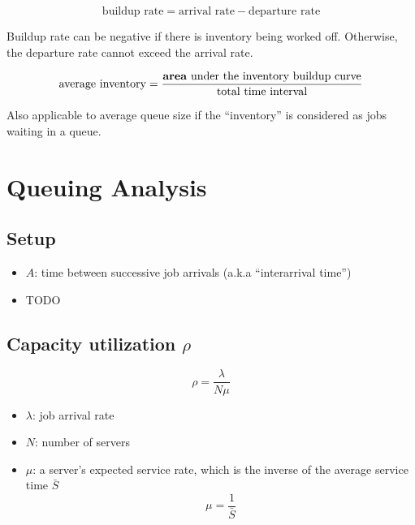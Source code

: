 \documentclass[11pt]{article}
\begin{document}
\begin{equation}
    \text{buildup rate} = \text{arrival rate} - \text{departure rate}
\end{equation}

Buildup rate can be negative if there is inventory being worked off. Otherwise, the departure rate cannot exceed the
arrival rate.

\begin{equation}
    \text{average inventory} = \frac{\text{\textbf{area} under the inventory buildup curve}}{\text{total time interval}}
\end{equation}

Also applicable to average queue size if the ``inventory'' is considered as jobs waiting in a queue.

\section{Queuing Analysis}

\subsection{Setup}

\begin{itemize}
    \item $A$: time between successive job arrivals (a.k.a ``interarrival time'')
    \item TODO
\end{itemize}

\subsection{Capacity utilization $\rho$}

\begin{equation}
    \rho = \frac{\lambda}{N \mu}
\end{equation}

\begin{itemize}
    \item $\lambda$: job arrival rate
    \item $N$: number of servers
    \item $\mu$: a server's expected service rate, which is the inverse of the average service time $\bar{S}$ \begin{equation}
        \mu = \frac{1}{\bar{S}}
    \end{equation}
\end{itemize}
\end{document}
